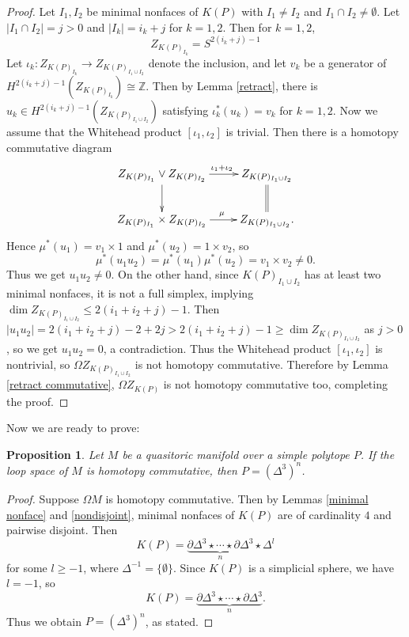 \documentclass[a4paper]{amsart}
\numberwithin{equation}{section}
\newtheorem{proposition}[theorem]{Proposition}
\theoremstyle{definition}
\theoremstyle{remark}
\numberwithin{equation}{section}
\newcommand{\Z}{\mathbb{Z}}
\begin{document}
\begin{proof}
  Let $I_1,I_2$ be minimal nonfaces of $K(P)$ with $I_1\ne I_2$ and $I_1\cap I_2\ne\emptyset$. Let $|I_1\cap I_2|=j>0$ and $|I_k|=i_k+j$ for $k=1,2$. Then for $k=1,2$,
  \[
    Z_{K(P)_{I_k}}=S^{2(i_k+j)-1}
  \]
  Let $\iota_k\colon Z_{K(P)_{I_k}}\to Z_{K(P)_{I_1\cup I_2}}$ denote the inclusion, and let $v_k$ be a generator of $H^{2(i_k+j)-1}(Z_{K(P)_{I_k}})\cong\Z$. Then by Lemma \ref{retract}, there is $u_k\in H^{2(i_k+j)-1}(Z_{K(P)_{I_1\cup I_2}})$ satisfying $\iota_k^*(u_k)=v_k$ for $k=1,2$. Now we assume that the Whitehead product $[\iota_1,\iota_2]$ is trivial. Then there is a homotopy commutative diagram
  \[
    \xymatrix{
      Z_{K(P)_{I_1}}\vee Z_{K(P)_{I_2}}\ar[r]^(.57){\iota_1+\iota_2}\ar[d]&Z_{K(P)_{I_1\cup I_2}}\ar@{=}[d]\\
      Z_{K(P)_{I_1}}\times Z_{K(P)_{I_2}}\ar[r]^(.57)\mu&Z_{K(P)_{I_1\cup I_2}}.
    }
  \]
  Hence $\mu^*(u_1)=v_1\times 1$ and $\mu^*(u_2)=1\times v_2$, so
  \[
    \mu^*(u_1u_2)=\mu^*(u_1)\mu^*(u_2)=v_1\times v_2\ne 0.
  \]
  Thus we get $u_1u_2\ne 0$. On the other hand, since $K(P)_{I_1\cup I_2}$ has at least two minimal nonfaces, it is not a full simplex, implying $\dim Z_{K(P)_{I_1\cup I_2}}\le 2(i_1+i_2+j)-1$. Then $|u_1u_2|=2(i_1+i_2+j)-2+2j>2(i_1+i_2+j)-1\ge \dim Z_{K(P)_{I_1\cup I_2}}$ as $j>0$, so we get $u_1u_2=0$, a contradiction. Thus the Whitehead product $[\iota_1,\iota_2]$ is nontrivial, so $\Omega Z_{K(P)_{I_1\cup I_2}}$ is not homotopy commutative. Therefore by Lemma \ref{retract commutative}, $\Omega Z_{K(P)}$ is not homotopy commutative too, completing the proof.
\end{proof}



Now we are ready to prove:



\begin{proposition}
  \label{polytope}
  Let $M$ be a quasitoric manifold over a simple polytope $P$. If the loop space of $M$ is homotopy commutative, then $P=(\Delta^3)^n$.
\end{proposition}

\begin{proof}
  Suppose $\Omega M$ is homotopy commutative. Then by Lemmas \ref{minimal nonface} and \ref{nondisjoint}, minimal nonfaces of $K(P)$ are of cardinality $4$ and pairwise disjoint. Then
  \[
    K(P)=\underbrace{\partial\Delta^3\star\cdots\star\partial\Delta^3}_n\star\Delta^l
  \]
  for some $l\ge -1$, where $\Delta^{-1}=\{\emptyset\}$. Since $K(P)$ is a simplicial sphere, we have $l=-1$, so
  \[
    K(P)=\underbrace{\partial\Delta^3\star\cdots\star\partial\Delta^3}_n.
  \]
  Thus we obtain $P=(\Delta^3)^n$, as stated.
\end{proof}
\end{document}
